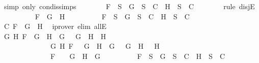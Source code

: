 \begin{isabellebody}
\ {\isacharparenleft}simp\ only{\isacharcolon}\ con{\isacharunderscore}dis{\isacharunderscore}simps{\isacharparenleft}{}{\isacharparenright}{\isacharparenright}\isanewline
\ \ \ \ \ \ \isamarkupfalse%
\ {\isachardoublequoteopen}F\ {\isasymin}\ S\ {\isasymlongrightarrow}\ {\isacharbraceleft}G{\isacharbraceright}\ {\isasymunion}\ S\ {\isasymin}\ C\ {\isasymor}\ {\isacharbraceleft}H{\isacharbraceright}\ {\isasymunion}\ S\ {\isasymin}\ C{\isachardoublequoteclose}\isanewline
\ \ \ \ \ \ \isamarkupfalse%
\ {\isacharparenleft}rule\ disjE{\isacharparenright}\isanewline
\ \ \ \ \ \ \ \ \isamarkupfalse%
\ {\isachardoublequoteopen}F\ {\isacharequal}\ G\ \isactrlbold {\isasymor}\ H{\isachardoublequoteclose}\isanewline
\ \ \ \ \ \ \ \ \isamarkupfalse%
\ {\isachardoublequoteopen}F\ {\isasymin}\ S\ {\isasymlongrightarrow}\ {\isacharbraceleft}G{\isacharbraceright}\ {\isasymunion}\ S\ {\isasymin}\ C\ {\isasymor}\ {\isacharbraceleft}H{\isacharbraceright}\ {\isasymunion}\ S\ {\isasymin}\ C{\isachardoublequoteclose}\isanewline
\ \ \ \ \ \ \ \ \ \ \isamarkupfalse%
\ C{}\ {\isacartoucheopen}F\ {\isacharequal}\ G\ \isactrlbold {\isasymor}\ H{\isacartoucheclose}\ \isamarkupfalse%
\ {\isacharparenleft}iprover\ elim{\isacharcolon}\ allE{\isacharparenright}\isanewline
\ \ \ \ \ \ \isamarkupfalse%
\isanewline
\ \ \ \ \ \ \ \ \isamarkupfalse%
\ {\isachardoublequoteopen}{\isacharparenleft}{\isasymexists}G{}\ H{}{\isachardot}\ F\ {\isacharequal}\ G{}\ \isactrlbold {\isasymrightarrow}\ H{}\ {\isasymand}\ G\ {\isacharequal}\ \isactrlbold {\isasymnot}\ G{}\ {\isasymand}\ H\ {\isacharequal}\ H{}{\isacharparenright}\ {\isasymor}\ \isanewline
\ \ \ \ \ \ \ \ \ \ \ \ \ \ {\isacharparenleft}{\isasymexists}G{}\ H{}{\isachardot}\ F\ {\isacharequal}\ \isactrlbold {\isasymnot}\ {\isacharparenleft}G{}\ \isactrlbold {\isasymand}\ H{}{\isacharparenright}\ {\isasymand}\ G\ {\isacharequal}\ \isactrlbold {\isasymnot}\ G{}\ {\isasymand}\ H\ {\isacharequal}\ \isactrlbold {\isasymnot}\ H{}{\isacharparenright}\ {\isasymor}\ \isanewline
\ \ \ \ \ \ \ \ \ \ \ \ \ \ F\ {\isacharequal}\ \isactrlbold {\isasymnot}\ {\isacharparenleft}\isactrlbold {\isasymnot}\ G{\isacharparenright}\ {\isasymand}\ H\ {\isacharequal}\ G{\isachardoublequoteclose}\isanewline
\ \ \ \ \ \ \ \ \isamarkupfalse%
\ {\isachardoublequoteopen}F\ {\isasymin}\ S\ {\isasymlongrightarrow}\ {\isacharbraceleft}G{\isacharbraceright}\ {\isasymunion}\ S\ {\isasymin}\ C\ {\isasymor}\ {\isacharbraceleft}H{\isacharbraceright}\ {\isasymunion}\ S\ {\isasymin}\ C{\isachardoublequoteclose}\isanewline

\end{isabellebody}
